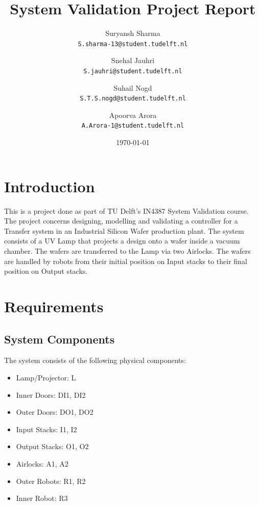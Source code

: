 \documentclass[a4paper,12pt]{article}
\begin{document}
\title{System Validation Project Report}
\author{
	Suryansh Sharma \\ 
	\texttt{S.sharma-13@student.tudelft.nl}
 	\and 
	Snehal Jauhri \\
	\texttt{S.jauhri@student.tudelft.nl} 
	\and
	Suhail Nogd \\
	\texttt{S.T.S.nogd@student.tudelft.nl} 	
	 \and 
	Apoorva Arora\\
	\texttt{A.Arora-1@student.tudelft.nl} 
}

\date {\today}
\maketitle

\section{Introduction}
This is a project done as part of TU Delft's IN4387 System Validation course. The project concerns designing, modelling and validating a controller for a Transfer system in an Industrial Silicon Wafer production plant.
The system consists of a UV Lamp that projects a design onto a wafer inside a vacuum chamber. The wafers are transferred to the Lamp via two Airlocks. The wafers are handled by robots from their initial position on Input stacks to their final position on Output stacks.

\section{Requirements}

\subsection{System Components}
The system consists of the following physical components:
\begin{itemize}
\item Lamp/Projector: L
\item Inner Doors: DI1, DI2
\item Outer Doors: DO1, DO2
\item Input Stacks: I1, I2
\item Output Stacks: O1, O2
\item Airlocks: A1, A2
\item Outer Robots: R1, R2
\item Inner Robot: R3
\end{itemize}
\end{document}

